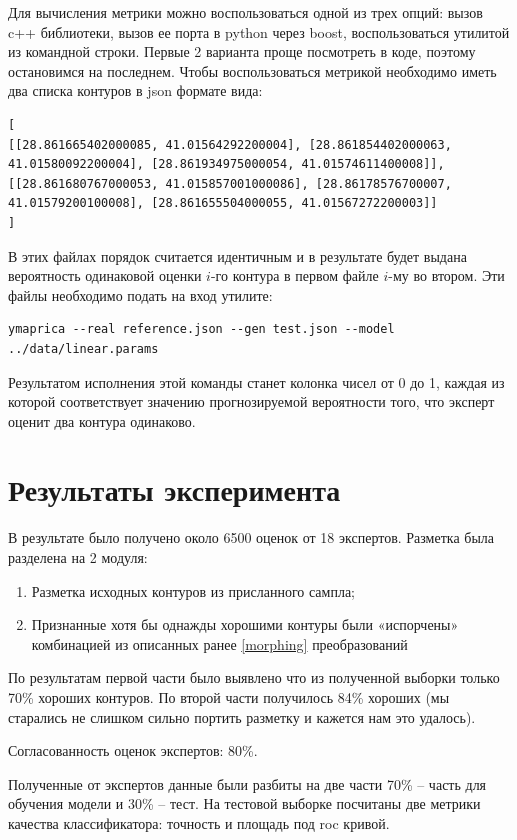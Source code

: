 \documentclass[12pt]{article}
\begin{document}
Для вычисления метрики можно воспользоваться одной из трех опций: вызов c++ библиотеки, вызов ее порта в python через boost, воспользоваться утилитой из командной строки. Первые 2 варианта проще посмотреть в коде, поэтому остановимся на последнем. Чтобы воспользоваться метрикой необходимо иметь два списка контуров в json формате вида:
{\tiny
\begin{verbatim}
[
[[28.861665402000085, 41.01564292200004], [28.861854402000063, 41.01580092200004], [28.861934975000054, 41.01574611400008]],
[[28.861680767000053, 41.015857001000086], [28.86178576700007, 41.01579200100008], [28.861655504000055, 41.01567272200003]]
]
\end{verbatim}
}
В этих файлах порядок считается идентичным и в результате будет выдана вероятность одинаковой оценки $i$-го контура в первом файле $i$-му во втором. Эти файлы необходимо подать на вход утилите:
{\footnotesize
\begin{verbatim}
ymaprica --real reference.json --gen test.json --model ../data/linear.params
\end{verbatim}}
Результатом исполнения этой команды станет колонка чисел от 0 до 1, каждая из которой соответствует значению прогнозируемой вероятности того, что эксперт оценит два контура одинаково.

\section{Результаты эксперимента}
\label{experiments}
В результате было получено около 6500 оценок от 18 экспертов.
Разметка была разделена на 2 модуля:
\begin{enumerate}
    \item Разметка исходных контуров из присланного сампла;
    \item Признанные хотя бы однажды хорошими контуры были «испорчены» комбинацией из описанных ранее \ref{morphing} преобразований
\end{enumerate}

По результатам первой части было выявлено что из полученной выборки только 70\% хороших контуров.
По второй части получилось 84\% хороших (мы старались не слишком сильно портить разметку и кажется нам это удалось).

Согласованность оценок экспертов: 80\%.

Полученные от экспертов данные были разбиты на две части 70\% -- часть для обучения модели и 30\% -- тест. На тестовой выборке посчитаны две метрики качества классификатора: точность и площадь под roc кривой.
\end{document}
